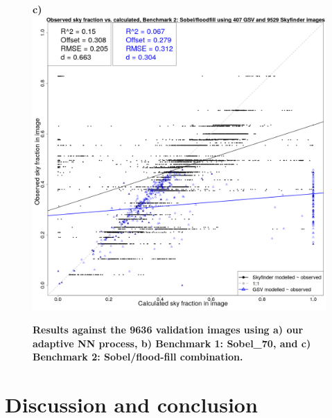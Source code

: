 \documentclass[final,3p,times,authoryear]{elsarticle}
\begin{document}
\begin{figure}
\textbf{c)}\includegraphics[scale=0.15]{Images/ErrorPlots2FloodfillValidation.png}
\caption{\textbf{
Results against the 9636 validation images using a) our adaptive NN process, b) Benchmark 1: Sobel\_70, and c) Benchmark 2: Sobel/flood-fill combination.}}
\label{fig:errorfloodall}
\end{figure}


\section{Discussion and conclusion}\label{sec:conclusion}
\end{document}
